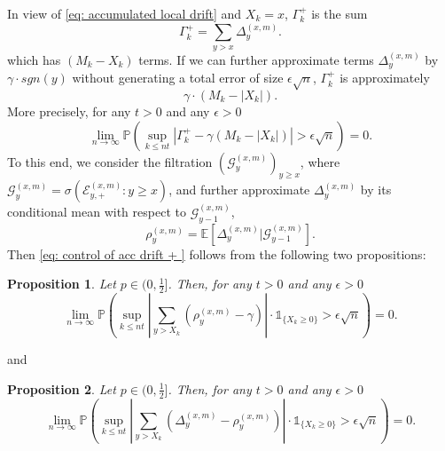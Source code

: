 \documentclass[twoside,12pt,a4paper]{article}
\newtheorem{proposition}{Proposition}[section]
\numberwithin{equation}{section}
\newcommand{\abs}[1]{\left\vert #1 \right\vert}
\begin{document}
	In view of \eqref{eq: accumulated local drift} and $X_k=x$, $\Gamma_k^+$ is the sum 
	$$
	\Gamma_k^+ = \sum_{y>x} \Delta_y^{(x,m)}.
	$$ which has $(M_k - X_k)$ terms. If we can further approximate terms $\Delta_y^{(x,m)}$ by $\gamma\cdot sgn(y)$ without generating a total error of size $\epsilon \sqrt{n}$, $\Gamma_k^+$ is approximately 
	$$   
	\gamma \cdot (M_k - \abs{X_k}).
	$$
	More precisely, for any $t>0$ and any $\epsilon >0$
	\begin{equation}\label{eq: control of acc drift + }
		\lim_{n \to \infty }\mathbb{P}\left(\sup_{k\leq nt} \abs{\Gamma^+_k - \gamma \left(M_k - \abs{X_k} \right)   } > \epsilon \sqrt{n}  \right) =0. 
	\end{equation}
	To this end, we consider the filtration $\left(\mathcal{G}_{y}^{(x,m)}\right)_{y\geq x}$, where $ \mathcal{G}_{y}^{(x,m)} = \sigma\left( \mathcal{E}^{(x,m)}_{y,+} : y \geq x \right)$, and further approximate $\Delta_y^{(x,m)}$ by its conditional mean with respect to $\mathcal{G}_{y-1}^{(x,m)}$,
	\begin{equation}\label{eq: conditional mean}
		\rho_{y}^{(x,m)}= \mathbb{E}\left[\Delta_y^{(x,m)} | \mathcal{G}_{y-1}^{(x,m)}\right].
	\end{equation}
	Then \eqref{eq: control of acc drift + } follows from the following two propositions:
	\begin{proposition}\label{lm: approximation of means of local drift}
		Let $p\in (0,\frac{1}{2}]$. Then, for any $t>0$ and any $\epsilon >0$
		\begin{equation}\label{eq: control of expected local drift}
			\lim_{n \to \infty }\mathbb{P}\left(\sup_{k\leq nt} \abs{\sum_{y> X_k} \left( \rho_{y}^{(x,m)} - \gamma  \right)   }\cdot\mathbb{1}_{\{X_k\geq 0\}} > \epsilon \sqrt{n}  \right) =0. 
		\end{equation}
	\end{proposition}
	and
	\begin{proposition}\label{lm: approx local drift by conditional means}
		Let $p\in (0,\frac{1}{2}]$. Then, for any $t>0$ and any $\epsilon >0$
		\begin{equation}\label{eq: control of martingale difference for local drift}
			\lim_{n \to \infty }\mathbb{P}\left(\sup_{k\leq nt} \abs{\sum_{y> X_k} \left(\Delta_{y}^{(x,m)}- \rho_{y}^{(x,m)} \right)   } \cdot\mathbb{1}_{\{X_k\geq 0\}} > \epsilon \sqrt{n}  \right) =0. 
		\end{equation}
	\end{proposition}
\end{document}
